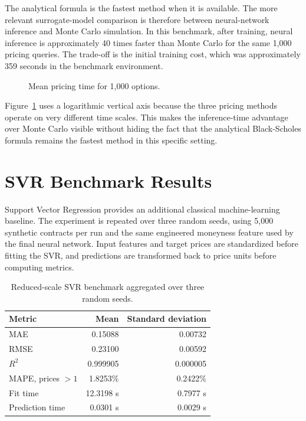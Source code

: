 The analytical formula is the fastest method when it is available.
The more relevant surrogate-model comparison is therefore between neural-network inference and Monte Carlo simulation.
In this benchmark, after training, neural inference is approximately 40 times faster than Monte Carlo for the same 1,000 pricing queries.
The trade-off is the initial training cost, which was approximately 359 seconds in the benchmark environment.

\begin{figure}[H]
    \centering
    \caption{Mean pricing time for 1,000 options.}
    \label{fig:runtime-comparison}
\end{figure}

Figure~\ref{fig:runtime-comparison} uses a logarithmic vertical axis because the three pricing methods operate on very different time scales.
This makes the inference-time advantage over Monte Carlo visible without hiding the fact that the analytical Black-Scholes formula remains the fastest method in this specific setting.

\section{SVR Benchmark Results}

Support Vector Regression provides an additional classical machine-learning baseline.
The experiment is repeated over three random seeds, using 5,000 synthetic contracts per run and the same engineered moneyness feature used by the final neural network.
Input features and target prices are standardized before fitting the SVR, and predictions are transformed back to price units before computing metrics.

\begin{table}[H]
    \centering
    \begin{tabular}{lrr}
        \toprule
        Metric             & Mean      & Standard deviation \\
        \midrule
        MAE                & 0.15088   & 0.00732            \\
        RMSE               & 0.23100   & 0.00592            \\
        $R^2$              & 0.999905  & 0.000005           \\
        MAPE, prices $> 1$ & 1.8253\%  & 0.2422\%           \\
        Fit time           & 12.3198 s & 0.7977 s           \\
        Prediction time    & 0.0301 s  & 0.0029 s           \\
        \bottomrule
    \end{tabular}
    \caption{Reduced-scale SVR benchmark aggregated over three random seeds.}
    \label{tab:svr-benchmark}
\end{table}

